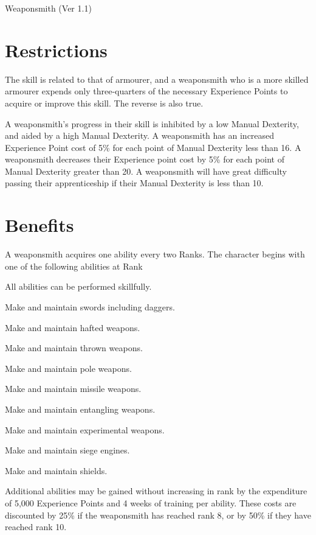 \begin{Chapter}{Weaponsmith (Ver 1.1)}

\section{Restrictions}

The skill is related to that of armourer, and a weaponsmith who is a
more skilled armourer expends only three-quarters of the necessary
Experience Points to acquire or improve this skill.  The reverse is
also true.

A weaponsmith’s progress in their skill is inhibited by a low Manual
Dexterity, and aided by a high Manual Dexterity.  A weaponsmith has an
increased Experience Point cost of 5\% for each point of Manual
Dexterity less than 16.  A weaponsmith decreases their Experience
point cost by 5\% for each point of Manual Dexterity greater than
20. A weaponsmith will have great difficulty passing their
apprenticeship if their Manual Dexterity is less than 10.

\section{Benefits}

A weaponsmith acquires one ability every two Ranks.  The character
begins with one of the following abilities at Rank

\begin{Enumerate}
\setcounter{enumi}{-1}
\item  All abilities can be performed skillfully. 
\item  Make and maintain swords including daggers. 
\item  Make and maintain hafted weapons. 
\item  Make and maintain thrown weapons. 
\item  Make and maintain pole weapons. 
\item  Make and maintain missile weapons. 
\item  Make and maintain entangling weapons.
\item  Make and maintain experimental weapons. 
\item  Make and maintain siege engines. 
\item  Make and maintain shields. 
\end{Enumerate}

Additional abilities may be gained without increasing in rank by the
expenditure of 5,000 Experience Points and 4 weeks of training per
ability.  These costs are discounted by 25\% if the weaponsmith has
reached rank 8, or by 50\% if they have reached rank 10.


\end{Chapter}
